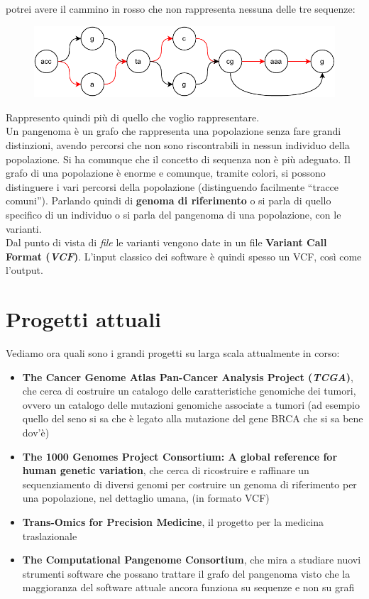 \documentclass[a4paper,12pt, oneside]{book}
\begin{document}
potrei avere il cammino in rosso che non rappresenta nessuna delle tre sequenze:
\begin{figure}[H]
  \centering
  \includegraphics[width=\textwidth]{img/gra2.pdf}
\end{figure}
Rappresento quindi più di quello che voglio rappresentare.\\
Un pangenoma è un grafo che rappresenta una popolazione senza fare grandi
distinzioni, avendo percorsi che non sono riscontrabili in nessun individuo
della popolazione. Si ha comunque che il concetto di sequenza non è più
adeguato. Il grafo di una popolazione è enorme e comunque, tramite colori, si
possono distinguere i vari percorsi della popolazione (distinguendo facilmente
``tracce comuni''). Parlando quindi di \textbf{genoma di riferimento} o si parla
di quello specifico di un individuo o si parla del pangenoma di una popolazione,
con le varianti.\\
Dal punto di vista di \textit{file} le varianti vengono date in un file
\textbf{Variant Call Format (\textit{VCF})}. L'input classico dei software è
quindi spesso un VCF, così come l'output.
\section{Progetti attuali}
Vediamo ora quali sono i grandi progetti su larga scala attualmente in corso:
\begin{itemize}
  \item \textbf{The Cancer Genome Atlas Pan-Cancer Analysis Project
    (\textit{TCGA})}, che cerca di costruire un catalogo delle caratteristiche
  genomiche dei tumori, ovvero un catalogo delle mutazioni genomiche associate a
  tumori (ad esempio quello del seno si sa che è legato alla mutazione del gene
  BRCA che si sa bene dov'è)
  \item \textbf{The 1000 Genomes Project Consortium: A global reference for
    human genetic variation}, che cerca di ricostruire e raffinare un
  sequenziamento di diversi genomi per costruire 
  un genoma di riferimento per una popolazione, nel dettaglio umana, (in formato
  VCF) 
  \item \textbf{Trans-Omics for Precision Medicine}, il progetto per la medicina
  traslazionale 
  \item \textbf{The Computational Pangenome Consortium}, che mira a studiare
  nuovi strumenti software che possano trattare il grafo del pangenoma visto che
  la maggioranza del software attuale ancora funziona su sequenze e non su grafi
\end{itemize}
\end{document}
